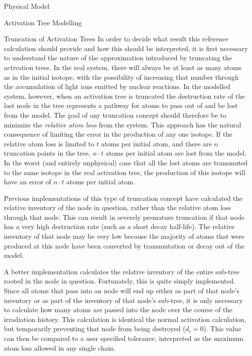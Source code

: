 \begin{chapter}{Physical Model\label{chap:physical}}
\begin{section}{Activation Tree Modelling\label{sec:physical.chains}}
\begin{subsection}{Truncation of Activation Trees}
    In order to decide what result this reference calculation should
    provide and how this should be interpreted, it is first necessary
    to understand the nature of the approximation introduced by
    truncating the activation trees.  In the real system, there will
    always be at least as many atoms as in the initial isotope, with
    the possibility of increasing that number through the accumulation
    of light ions emitted by nuclear reactions.  In the modelled
    system, however, when an activation tree is truncated the
    destruction rate of the last node in the tree represents a pathway
    for atoms to pass out of and be lost from the model.  The goal of
    any truncation concept should therefore be to minimize the
    \textsl{relative atom loss} from the system.  This approach has
    the natural consequence of limiting the error in the production of
    any one isotope.  If the relative atom loss is limited to $t$
    atoms per initial atom, and there are $n$ truncation points in the
    tree, $n\cdot t$ atoms per initial atom are lost from the model.
    In the worst (and entirely unphysical) case that all the lost
    atoms are transmuted to the same isotope in the real activation
    tree, the production of this isotope will have an error of $n
    \cdot t$ atoms per initial atom.
    
    Previous implementations of this type of truncation concept have
    calculated the relative inventory of the node in question, rather
    than the relative atom loss through that node.  This can result in
    severely premature truncation if that node has a very high
    destruction rate (such as a short decay half-life).  The relative
    inventory of that node may be very low because the majority of
    atoms that were produced at this node have been converted by
    transmutation or decay out of the model.  
    
    A better implementation calculates the relative inventory of the
    entire sub-tree rooted in the node in question.  Fortunately, this
    is quite simply implemented.  Since all atoms that pass into an
    node will end up either as part of that node's inventory or as
    part of the inventory of that node's sub-tree, it is only
    necessary to calculate how many atoms are passed into the node
    over the course of the irradiation history.  This calculation is
    identical the normal activation calculation, but temporarily
    preventing that node from being destroyed ($d_i = 0$).  This value
    can then be compared to a user specified tolerance, interpreted as
    the maximum atom loss allowed in any single chain.
    

\end{subsection}
\end{section}
\end{chapter}
